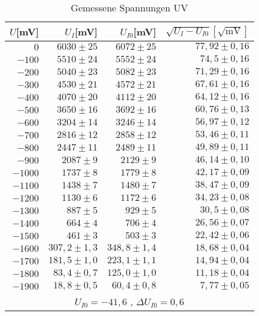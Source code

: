 \begin{table}[ht]
    \centering
    \caption{Gemessene Spannungen UV}
    \begin{tabular}{r | r | r | r}
    \toprule
    $U$[mV] & $U_I$[mV] & $U_{I0}$[mV] & $\sqrt{U_I  - U_{I0}}[\sqrt{\text{mV}}]$\\
    \midrule
    $0$     &   $6030 \pm 25$   & $6072 \pm 25$& $77,92 \pm 0,16$ \\
    $-100$  &   $5510 \pm 24$   & $5552 \pm 24$& $74,5 \pm 0,16$\\
    $-200$  &   $5040 \pm 23$   & $5082 \pm 23$& $71,29 \pm 0,16$\\
    $-300$  &   $4530 \pm 21$   & $4572 \pm 21$& $67,61 \pm 0,16$\\
    $-400$  &   $4070 \pm 20$   & $4112 \pm 20$& $64,12\pm 0,16$ \\
    $-500$  &   $3650 \pm 16$   & $3692 \pm 16$& $60,76 \pm 0,13$ \\
    $-600$  &   $3204 \pm 14$   & $3246 \pm 14$& $56,97 \pm 0,12$ \\
    $-700$  &   $2816 \pm 12$   & $2858 \pm 12$& $53,46 \pm 0,11$ \\
    $-800$  &   $2447 \pm 11$   & $2489 \pm 11$& $49,89 \pm 0,11$\\
    $-900$  &   $2087  \pm 9$   & $2129 \pm 9$& $46,14 \pm 0,10$\\
    $-1000$ &   $1737 \pm 8$    & $1779 \pm 8$& $42,17 \pm 0,09$\\
    $-1100$ &   $1438 \pm 7$    & $1480\pm 7$& $38,47 \pm 0,09$\\
    $-1200$ &   $1130 \pm 6$    & $1172 \pm 6$& $34,23 \pm 0,08$\\
    $-1300$ &   $887 \pm 5$     & $929 \pm 5$&$ 30,5 \pm 0,08$\\
    $-1400$ &   $664 \pm4$      & $706 \pm 4$& $26,56 \pm 0,07$\\
    $-1500$ &   $461 \pm 3$     & $503 \pm 3$& $22,42 \pm 0,06$\\
    $-1600$ &   $307,2 \pm 1,3$ & $348,8 \pm 1,4$& $18,68 \pm 0,04$\\
    $-1700$ &   $181,5 \pm 1,0$ & $223,1 \pm 1,1$& $14,94 \pm 0,04$\\
    $-1800$ &   $83,4 \pm 0,7$  & $125,0 \pm 1,0$& $ 11,18 \pm 0,04$\\
    $-1900$ &   $18,8 \pm 0,5$  & $60,4 \pm 0,8$& $7,77 \pm 0,05$\\
    \bottomrule
    \multicolumn{4}{c}{$U_{I0} = -41,6$ , $\Delta U_{I0} = 0,6$}
    
    \end{tabular}
    
\end{table}
\newpage

